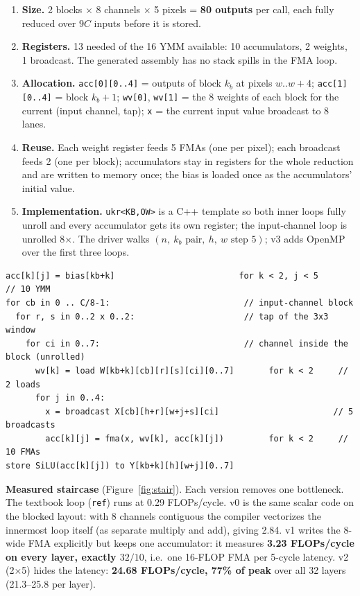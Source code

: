 \documentclass[10pt]{article}
\newcommand{\code}[1]{\texttt{#1}}
\begin{document}
\begin{enumerate}[label=(\alph*)]
\item \textbf{Size.} 2 blocks $\times$ 8 channels $\times$ 5 pixels = \textbf{80 outputs} per call, each fully reduced over $9C$ inputs before it is stored.
\item \textbf{Registers.} 13 needed of the 16 YMM available: 10 accumulators, 2 weights, 1 broadcast. The generated assembly has no stack spills in the FMA loop.
\item \textbf{Allocation.} \code{acc[0][0..4]} = outputs of block $k_b$ at pixels $w..w{+}4$; \code{acc[1][0..4]} = block $k_b{+}1$; \code{wv[0]}, \code{wv[1]} = the 8 weights of each block for the current (input channel, tap); \code{x} = the current input value broadcast to 8 lanes.
\item \textbf{Reuse.} Each weight register feeds 5 FMAs (one per pixel); each broadcast feeds 2 (one per block); accumulators stay in registers for the whole reduction and are written to memory once; the bias is loaded once as the accumulators' initial value.
\item \textbf{Implementation.} \code{ukr<KB,OW>} is a C++ template so both inner loops fully unroll and every accumulator gets its own register; the input-channel loop is unrolled 8$\times$. The driver walks $(n,\ k_b\text{ pair},\ h,\ w\text{ step } 5)$; v3 adds OpenMP over the first three loops.
\end{enumerate}
\begin{lstlisting}
acc[k][j] = bias[kb+k]                         for k < 2, j < 5      // 10 YMM
for cb in 0 .. C/8-1:                           // input-channel block
  for r, s in 0..2 x 0..2:                      // tap of the 3x3 window
    for ci in 0..7:                             // channel inside the block (unrolled)
      wv[k] = load W[kb+k][cb][r][s][ci][0..7]       for k < 2     // 2 loads
      for j in 0..4:
        x = broadcast X[cb][h+r][w+j+s][ci]                       // 5 broadcasts
        acc[k][j] = fma(x, wv[k], acc[k][j])         for k < 2     // 10 FMAs
store SiLU(acc[k][j]) to Y[kb+k][h][w+j][0..7]
\end{lstlisting}

\textbf{Measured staircase} (Figure~\ref{fig:stair}). Each version removes one bottleneck. The textbook loop (\code{ref}) runs at 0.29 FLOPs/cycle. v0 is the same scalar code on the blocked layout: with 8 channels contiguous the compiler vectorizes the innermost loop itself (as separate multiply and add), giving 2.84. v1 writes the 8-wide FMA explicitly but keeps one accumulator: it measures \textbf{3.23 FLOPs/cycle on every layer, exactly $32/10$}, i.e.\ one 16-FLOP FMA per 5-cycle latency. v2 (2$\times$5) hides the latency: \textbf{24.68 FLOPs/cycle, 77\% of peak} over all 32 layers (21.3--25.8 per layer).
\end{document}
